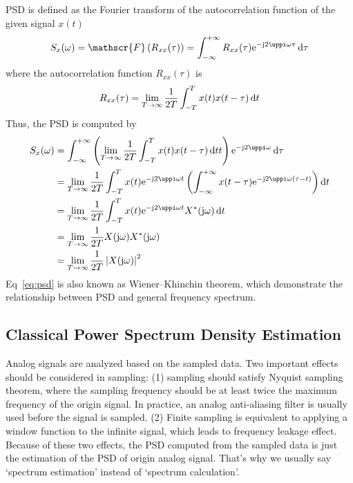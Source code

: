 PSD is defined as the Fourier transform of the autocorrelation function of the given signal $x(t)$
\begin{equation}
    S_x(\omega) = \mathscr{F}\left(R_{xx}(\tau)\right) = \int_{-\infty}^{+\infty} R_{xx}(\tau) \iexp{-\mathrm{j} 2 \uppi \omega \tau} \diff \tau
\end{equation}
where the autocorrelation function $R_{xx}(\tau)$ is 
\begin{equation}
    R_{xx}(\tau) = \lim_{T\to \infty} \frac{1}{2T}\int_{-T}^{T} x(t) x(t-\tau)  \mathop{}\!\mathrm{d} t
\end{equation}
Thus, the PSD is computed by
\begin{align}
    S_x(\omega) &= \int_{-\infty}^{+\infty} \left(\lim_{T\to \infty} \frac{1}{2T}\int_{-T}^{T} x(t) x(t-\tau)  \diff t t\right) \iexp{-\mathrm{j} 2 \uppi \omega} \diff \tau \notag \\ 
    &= \lim_{T\to \infty} \frac{1}{2T} \int_{-T}^{T} x(t)\iexp{-\mathrm{j} 2 \uppi \omega t} \left( \int_{-\infty}^{+\infty} x(t-\tau) \iexp{-\mathrm{j} 2 \uppi \omega \left(\tau-t\right)} \right) \diff t \notag \\
    &= \lim_{T\to \infty} \frac{1}{2T} \int_{-T}^{T} x(t)\iexp{-\mathrm{j} 2 \uppi \omega t} X^*(\jomega) \diff t \notag \\
    &= \lim_{T\to \infty} \frac{1}{2T} X(\jomega) X^*(\jomega) \notag \\
    &= \lim_{T\to \infty} \frac{1}{2T} \left| X(\jomega) \right|^2
        \label{eq:psd}
\end{align}
Eq~\eqref{eq:psd} is also known as Wiener–Khinchin theorem, which demonstrate the relationship between PSD and general frequency spectrum.




\subsection{Classical Power Spectrum Density Estimation}


Analog signals are analyzed based on the sampled data. Two important effects should be considered in sampling: (1) sampling should satisfy Nyquist sampling theorem, where the sampling frequency should be at least twice the maximum frequency of the origin signal. In practice, an analog anti-aliasing filter is usually used before the signal is sampled. (2) Finite sampling is equivalent to applying a window function to the infinite signal, which leads to frequency leakage effect. Because of these two effects, the PSD computed from the sampled data is just the estimation of the PSD of origin analog signal. That's why we usually say `spectrum estimation' instead of `spectrum calculation'.


